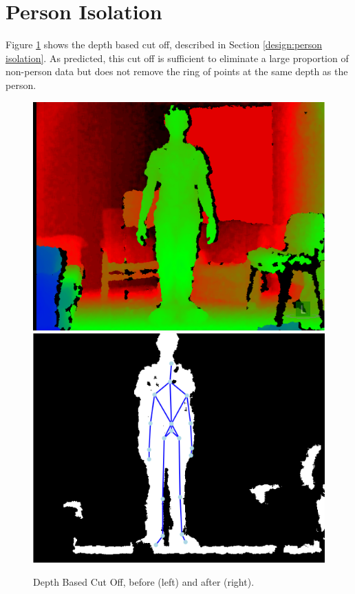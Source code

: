 \section{Person Isolation}
\label{testing:person isolation}
Figure \ref{fig:depth based cut off} shows the depth based cut off, described in Section \ref{design:person isolation}. As predicted, this cut off is sufficient to eliminate a large proportion of non-person data but does not remove the ring of points at the same depth as the person.\\

\begin{figure}[h]
\begin{center}
\includegraphics[scale=0.4]{./design/parse1} 
\includegraphics[scale=0.4]{./design/parse2}
\end{center}
\caption{Depth Based Cut Off, before (left) and after (right).}
\label{fig:depth based cut off}
\end{figure} 

